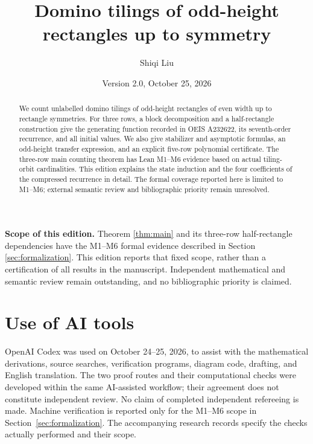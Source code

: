 \documentclass[11pt,a4paper]{amsart}
\title[Domino tilings up to symmetry]{Domino tilings of odd-height rectangles up to symmetry}
\author{Shiqi Liu}
\date{Version 2.0, October 25, 2026}
\theoremstyle{definition}
\theoremstyle{remark}
\numberwithin{equation}{section}
\begin{document}
\begin{abstract}
We count unlabelled domino tilings of odd-height rectangles of even width up to rectangle symmetries. For three rows, a block decomposition and a half-rectangle construction give the generating function recorded in OEIS A232622, its seventh-order recurrence, and all initial values. We also give stabilizer and asymptotic formulas, an odd-height transfer expression, and an explicit five-row polynomial certificate. The three-row main counting theorem has Lean M1--M6 evidence based on actual tiling-orbit cardinalities. This edition explains the state induction and the four coefficients of the compressed recurrence in detail. The formal coverage reported here is limited to M1--M6; external semantic review and bibliographic priority remain unresolved.
\end{abstract}
\maketitle
\noindent\textbf{Scope of this edition.}
Theorem \ref{thm:main} and its three-row half-rectangle dependencies
have the M1--M6 formal evidence described in Section \ref{sec:formalization}.
This edition reports that fixed scope, rather than a certification of
all results in the manuscript. Independent mathematical and semantic
review remain outstanding, and no bibliographic priority is claimed.
\medskip









\appendix


\section*{Use of AI tools}
OpenAI Codex was used on October 24--25, 2026, to assist with the mathematical derivations, source searches, verification programs, diagram code, drafting, and English translation. The two proof routes and their computational checks were developed within the same AI-assisted workflow; their agreement does not constitute independent review. No claim of completed independent refereeing is made. Machine verification is reported only for the M1--M6 scope in Section~\ref{sec:formalization}. The accompanying research records specify the checks actually performed and their scope.

\end{document}
